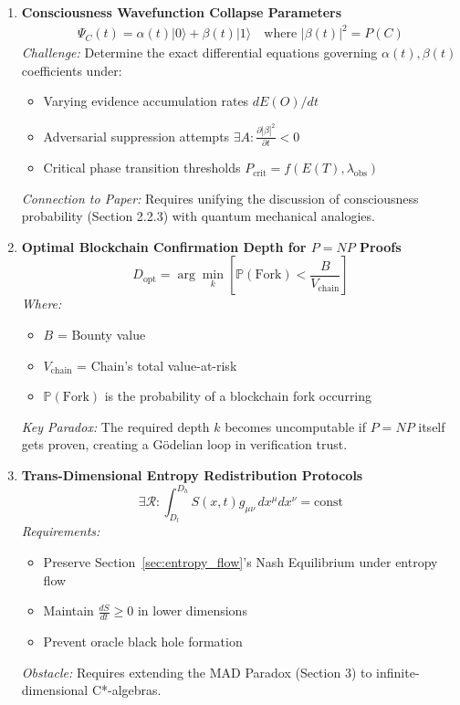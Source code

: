 \documentclass[11pt]{article}
\begin{document}
\begin{enumerate}
\item \textbf{Consciousness Wavefunction Collapse Parameters}
\begin{align*}
\Psi_C(t) = \alpha(t)|0\rangle + \beta(t)|1\rangle \quad \text{where } |\beta(t)|^2 = P(C)
\end{align*}
\textit{Challenge:} Determine the exact differential equations governing $\alpha(t),\beta(t)$ coefficients under:  
\begin{itemize}
\item Varying evidence accumulation rates $dE(O)/dt$
\item Adversarial suppression attempts $\exists A:\frac{\partial|\beta|^2}{\partial t}<0$
\item Critical phase transition thresholds $P_{\text{crit}} = f(E(T),\lambda_{\text{obs}})$
\end{itemize}
\textit{Connection to Paper:} Requires unifying the discussion of consciousness probability (Section 2.2.3) with quantum mechanical analogies.

\item \textbf{Optimal Blockchain Confirmation Depth for $P=NP$ Proofs}
\begin{equation*}
D_{\text{opt}} = \arg\min_{k}\left[\mathbb{P}(\text{Fork}) < \frac{B}{V_{\text{chain}}}\right]
\end{equation*}
\textit{Where:}
\begin{itemize}
\item $B$ = Bounty value
\item $V_{\text{chain}}$ = Chain's total value-at-risk
\item $\mathbb{P}(\text{Fork})$ is the probability of a blockchain fork occurring
\end{itemize}
\textit{Key Paradox:} The required depth $k$ becomes uncomputable if $P=NP$ itself gets proven, creating a Gödelian loop in verification trust.

\item \textbf{Trans-Dimensional Entropy Redistribution Protocols}
\begin{equation*}
\exists\mathcal{R}:\int_{D_l}^{D_h} S(x,t)g_{\mu\nu}\,dx^\mu dx^\nu = \text{const}
\end{equation*}
\textit{Requirements:}
\begin{itemize}
\item Preserve Section~\ref{sec:entropy_flow}'s Nash Equilibrium under entropy flow
\item Maintain $\frac{dS}{dt}\geq0$ in lower dimensions
\item Prevent oracle black hole formation
\end{itemize}
\textit{Obstacle:} Requires extending the MAD Paradox (Section 3) to infinite-dimensional C*-algebras.
\end{enumerate}



\end{document}
